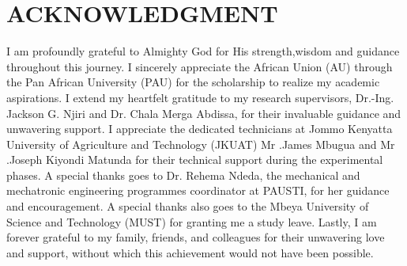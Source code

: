 \documentclass[12pt,a4paper]{report}
\begin{document}
				\section*{\hspace{5cm}ACKNOWLEDGMENT}
     \vspace{0.5cm}
I am profoundly grateful to Almighty God for His strength,wisdom and guidance throughout this journey. I sincerely appreciate the African Union (AU) through the Pan African University (PAU) for the scholarship to realize my academic aspirations. I extend my heartfelt gratitude to my research supervisors, Dr.-Ing. Jackson G. Njiri and Dr. Chala Merga Abdissa, for their invaluable guidance and unwavering support. I appreciate the dedicated technicians at Jommo Kenyatta University of Agriculture and Technology (JKUAT) Mr .James Mbugua and Mr .Joseph Kiyondi Matunda for their technical support during the experimental phases. A special thanks goes to Dr. Rehema Ndeda, the mechanical and mechatronic engineering programmes coordinator at PAUSTI, for her guidance and encouragement. A special thanks also goes to the Mbeya University of Science and Technology (MUST) for granting me a study leave. Lastly, I am forever grateful to my family, friends, and colleagues for their unwavering love and support, without which this achievement would not have been possible.
	
			\newpage
{}
\renewcommand{\contentsname}{TABLE OF CONTENTS}
\tableofcontents


\newpage
			\listoffigures %

    \newpage


		\listoftables 

  

            
			
 


\end{document}
